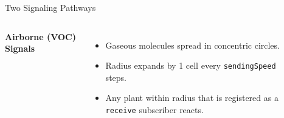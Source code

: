 \documentclass[aspectratio=169]{beamer}
\begin{document}
\begin{frame}{Two Signaling Pathways}
    \begin{columns}[T, onlytextwidth]
        \textbf{Airborne (VOC) Signals}
        \begin{itemize}
            \item Gaseous molecules spread in concentric circles.
            \item Radius expands by 1 cell every \texttt{sendingSpeed} steps.
            \item Any plant within radius that is registered as a \texttt{receive} subscriber reacts.
        \end{itemize}
        \vspace{0.3cm}
        \begin{center}
        \end{center}


\end{columns}
\end{frame}
\end{document}
